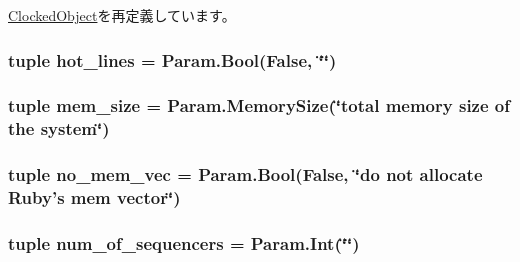 \hyperlink{classClockedObject_1_1ClockedObject_a17da7064bc5c518791f0c891eff05fda}{ClockedObject}を再定義しています。\hypertarget{classRubySystem_1_1RubySystem_a27213f0449c5af2ea4c6a1f2c8473f4c}{
\subsubsection[{hot\_\-lines}]{\setlength{\rightskip}{0pt plus 5cm}tuple hot\_\-lines = Param.Bool(False, \char`\"{}\char`\"{})}}
\label{classRubySystem_1_1RubySystem_a27213f0449c5af2ea4c6a1f2c8473f4c}
\hypertarget{classRubySystem_1_1RubySystem_a06f484e37e051960e829755013a60b16}{
\subsubsection[{mem\_\-size}]{\setlength{\rightskip}{0pt plus 5cm}tuple mem\_\-size = Param.MemorySize(\char`\"{}total memory size of the system\char`\"{})}}
\label{classRubySystem_1_1RubySystem_a06f484e37e051960e829755013a60b16}
\hypertarget{classRubySystem_1_1RubySystem_a3054467f348a319c6456cfb441f1e10c}{
\subsubsection[{no\_\-mem\_\-vec}]{\setlength{\rightskip}{0pt plus 5cm}tuple no\_\-mem\_\-vec = Param.Bool(False, \char`\"{}do not allocate Ruby's mem vector\char`\"{})}}
\label{classRubySystem_1_1RubySystem_a3054467f348a319c6456cfb441f1e10c}
\hypertarget{classRubySystem_1_1RubySystem_af8a467f812c4e782637454bb5b504cc9}{
\subsubsection[{num\_\-of\_\-sequencers}]{\setlength{\rightskip}{0pt plus 5cm}tuple num\_\-of\_\-sequencers = Param.Int(\char`\"{}\char`\"{})}}
